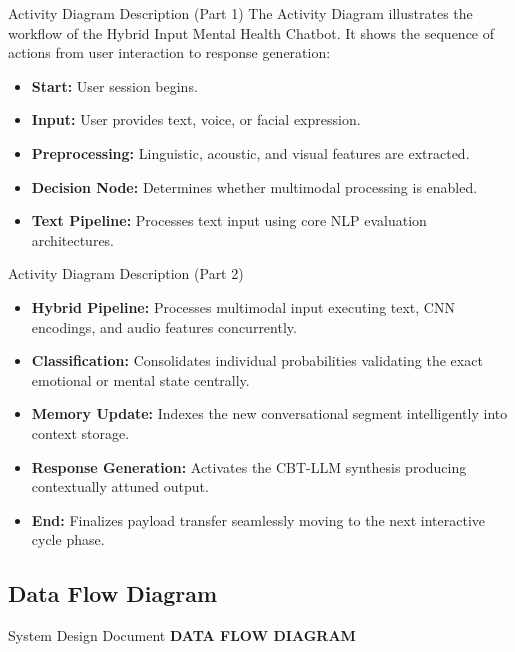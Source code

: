 \documentclass[11pt]{beamer}
\begin{document}
\begin{frame}{Activity Diagram Description (Part 1)}
The Activity Diagram illustrates the workflow of the Hybrid Input Mental Health Chatbot. It shows the sequence of actions from user interaction to response generation:

\begin{itemize}
    \item \textbf{Start:} User session begins.
    \item \textbf{Input:} User provides text, voice, or facial expression.
    \item \textbf{Preprocessing:} Linguistic, acoustic, and visual features are extracted.
    \item \textbf{Decision Node:} Determines whether multimodal processing is enabled.
    \item \textbf{Text Pipeline:} Processes text input using core NLP evaluation architectures.
\end{itemize}
\end{frame}

\begin{frame}{Activity Diagram Description (Part 2)}
\begin{itemize}
    \item \textbf{Hybrid Pipeline:} Processes multimodal input executing text, CNN encodings, and audio features concurrently.
    \item \textbf{Classification:} Consolidates individual probabilities validating the exact emotional or mental state centrally.
    \item \textbf{Memory Update:} Indexes the new conversational segment intelligently into context storage.
    \item \textbf{Response Generation:} Activates the CBT-LLM synthesis producing contextually attuned output.
    \item \textbf{End:} Finalizes payload transfer seamlessly moving to the next interactive cycle phase.
\end{itemize}
\end{frame}


\subsection{Data Flow Diagram}
\begin{frame}{System Design Document}
    \justifying
    \centering
    \huge \textbf{DATA FLOW DIAGRAM}
\end{frame}
\end{document}
